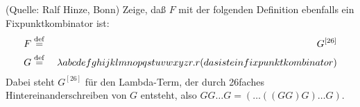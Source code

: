 \begin{aufgabe} (Quelle: Ralf Hinze, Bonn)
  Zeige, daß $F$ mit der folgenden Definition ebenfalls ein
  Fixpunktkombinator ist:
  \begin{eqnarray*}
    F &\stackrel{\rm def}{=}{}& G^{[26]}
    \\
    G &\stackrel{\rm def}{=}{}& \lambda abcdefghijklmnopqstuvwxyzr.r(dasisteinfixpunktkombinator)
  \end{eqnarray*}
  Dabei steht $G^{[26]}$ für den Lambda-Term, der durch 26faches
  Hintereinanderschreiben von $G$ entsteht, also $GG\ldots G = (\ldots
  ((G G) G)\ldots G)$.
  

\end{aufgabe}

